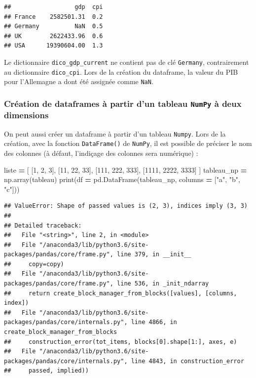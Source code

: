\documentclass[12pt,]{book}
\newenvironment{Shaded}{\begin{snugshade}}{\end{snugshade}}
\newcommand{\DecValTok}[1]{\textcolor[rgb]{0.00,0.00,0.81}{#1}}
\newcommand{\StringTok}[1]{\textcolor[rgb]{0.31,0.60,0.02}{#1}}
\newcommand{\OperatorTok}[1]{\textcolor[rgb]{0.81,0.36,0.00}{\textbf{#1}}}
\newcommand{\BuiltInTok}[1]{#1}
\newcommand{\NormalTok}[1]{#1}
\numberwithin{equation}{section}
\numberwithin{countremarque}{section}
\let\BeginKnitrBlock\begin \let\EndKnitrBlock\end
\begin{document}
\begin{lstlisting}
##                  gdp  cpi
## France    2582501.31  0.2
## Germany          NaN  0.5
## UK        2622433.96  0.6
## USA      19390604.00  1.3
\end{lstlisting}

\BeginKnitrBlock{remarque}
Le dictionnaire \texttt{dico\_gdp\_current} ne contient pas de clé
\texttt{Germany}, contrairement au dictionnaire \texttt{dico\_cpi}. Lors
de la création du dataframe, la valeur du PIB pour l'Allemagne a dont
été assignée comme \texttt{NaN}.
\EndKnitrBlock{remarque}

\subsubsection{\texorpdfstring{Création de dataframes à partir d'un
tableau \texttt{NumPy} à deux
dimensions}{Création de dataframes à partir d'un tableau NumPy à deux dimensions}}\label{creation-de-dataframes-a-partir-dun-tableau-numpy-a-deux-dimensions}

On peut aussi créer un dataframe à partir d'un tableau \texttt{Numpy}.
Lors de la création, avec la fonction \texttt{DataFrame()} de
\texttt{NumPy}, il est possible de préciser le nom des colonnes (à
défaut, l'indiçage des colonnes sera numérique) :

\begin{Shaded}
\begin{Highlighting}[]
\NormalTok{liste }\OperatorTok{=}\NormalTok{ [}
\NormalTok{    [}\DecValTok{1}\NormalTok{, }\DecValTok{2}\NormalTok{, }\DecValTok{3}\NormalTok{],}
\NormalTok{    [}\DecValTok{11}\NormalTok{, }\DecValTok{22}\NormalTok{, }\DecValTok{33}\NormalTok{],}
\NormalTok{    [}\DecValTok{111}\NormalTok{, }\DecValTok{222}\NormalTok{, }\DecValTok{333}\NormalTok{],}
\NormalTok{    [}\DecValTok{1111}\NormalTok{, }\DecValTok{2222}\NormalTok{, }\DecValTok{3333}\NormalTok{]}
\NormalTok{]}
\NormalTok{tableau_np }\OperatorTok{=}\NormalTok{ np.array(tableau)}
\BuiltInTok{print}\NormalTok{(df }\OperatorTok{=}\NormalTok{ pd.DataFrame(tableau_np,}
\NormalTok{                  columns }\OperatorTok{=}\NormalTok{ [}\StringTok{"a"}\NormalTok{, }\StringTok{"b"}\NormalTok{, }\StringTok{"c"}\NormalTok{]))}
\end{Highlighting}
\end{Shaded}

\begin{lstlisting}
## ValueError: Shape of passed values is (2, 3), indices imply (3, 3)
## 
## Detailed traceback: 
##   File "<string>", line 2, in <module>
##   File "/anaconda3/lib/python3.6/site-packages/pandas/core/frame.py", line 379, in __init__
##     copy=copy)
##   File "/anaconda3/lib/python3.6/site-packages/pandas/core/frame.py", line 536, in _init_ndarray
##     return create_block_manager_from_blocks([values], [columns, index])
##   File "/anaconda3/lib/python3.6/site-packages/pandas/core/internals.py", line 4866, in create_block_manager_from_blocks
##     construction_error(tot_items, blocks[0].shape[1:], axes, e)
##   File "/anaconda3/lib/python3.6/site-packages/pandas/core/internals.py", line 4843, in construction_error
##     passed, implied))
\end{lstlisting}
\end{document}
